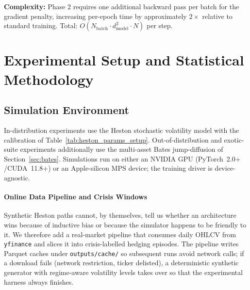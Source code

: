 \documentclass[11pt,oneside]{report}
\begin{document}
\textbf{Complexity:} Phase 2 requires one additional backward pass per batch for the gradient penalty, increasing per-epoch time by approximately $2\times$ relative to standard training. Total: $O(N_{\mathrm{batch}} \cdot d_{\mathrm{model}}^2 \cdot N)$ per step.


\chapter{Experimental Setup and Statistical Methodology}
\label{sec:setup}

\section{Simulation Environment}

In-distribution experiments use the Heston stochastic volatility model with the calibration of Table~\ref{tab:heston_params_setup}. Out-of-distribution and exotic-suite experiments additionally use the multi-asset Bates jump-diffusion of Section~\ref{sec:bates}.  Simulations run on either an NVIDIA GPU (PyTorch~2.0$+$/CUDA~11.8$+$) or an Apple-silicon MPS device; the training driver is device-agnostic.

\subsubsection{Online Data Pipeline and Crisis Windows}
\label{sec:online_data}

Synthetic Heston paths cannot, by themselves, tell us whether an architecture wins because of inductive bias or because the simulator happens to be friendly to it. We therefore add a real-market pipeline that consumes daily OHLCV from \texttt{yfinance} and slices it into crisis-labelled hedging episodes. The pipeline writes Parquet caches under \texttt{outputs/cache/} so subsequent runs avoid network calls; if a download fails (network restriction, ticker delisted), a deterministic synthetic generator with regime-aware volatility levels takes over so that the experimental harness always finishes.
\end{document}
